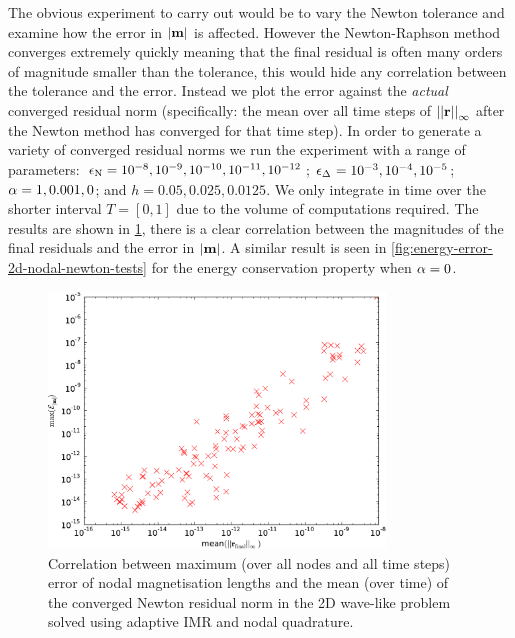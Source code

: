 The obvious experiment to carry out would be to vary the Newton tolerance and examine how the error in $\left|{\boldsymbol{\mathrm{m}}} \right|$ is affected.
However the Newton-Raphson method converges extremely quickly meaning that the final residual is often many orders of magnitude smaller than the tolerance, this would hide any correlation between the tolerance and the error.
Instead we plot the error against the \emph{actual} converged residual norm (specifically: the mean over all time steps of $\left| \left| \boldsymbol{\mathrm{r}} \right| \right|_\infty$ after the Newton method has converged for that time step).
In order to generate a variety of converged residual norms we run the experiment with a range of parameters: $\epsilon_{\mathrm{N}} = 10^{-8}, 10^{-9}, 10^{-10}, 10^{-11}, 10^{-12}$; $\epsilon_{\Delta_{}} = 10^{-3}, 10^{-4}, 10^{-5}$; $\alpha = 1, 0.001, 0$; and $h = 0.05, 0.025, 0.0125$.
We only integrate in time over the shorter interval $T = [0, 1]$ due to the volume of computations required.
The results are shown in \cref{fig:ml-error-2d-nodal-newton-tests}, there is a clear correlation between the magnitudes of the final residuals and the error in $\left|{\boldsymbol{\mathrm{m}}} \right|$.
A similar result is seen in \cref{fig:energy-error-2d-nodal-newton-tests} for the energy conservation property when $\alpha = 0$.

\begin{figure}
  \centering
  \includegraphics[width=0.8\textwidth]
{plots/2d_wave_solution_m_length_newton_res/maxofmlengtherrormaxesvsmeanminofnewtonresiduals.pdf}
  \caption{Correlation between maximum (over all nodes and all time steps) error of nodal magnetisation lengths and the mean (over time) of the converged Newton residual norm in the 2D wave-like problem solved using adaptive IMR and nodal quadrature.
  }
  \label{fig:ml-error-2d-nodal-newton-tests}
\end{figure}


